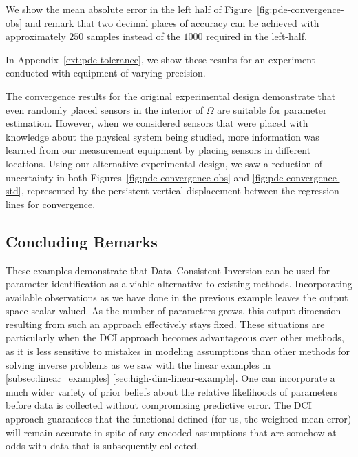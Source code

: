 We show the mean absolute error in the left half of Figure~\ref{fig:pde-convergence-obs} and remark that two decimal places of accuracy can be achieved with approximately $250$ samples instead of the $1000$ required in the left-half.

In Appendix~\ref{ext:pde-tolerance}, we show these results for an experiment conducted with equipment of varying precision.

The convergence results for the original experimental design demonstrate that even randomly placed sensors in the interior of $\Omega$ are suitable for parameter estimation.
However, when we considered sensors that were placed with knowledge about the physical system being studied, more information was learned from our measurement equipment by placing sensors in different locations.
Using our alternative experimental design, we saw a reduction of uncertainty in both Figures~\ref{fig:pde-convergence-obs} and \ref{fig:pde-convergence-std}, represented by the persistent vertical displacement between the regression lines for convergence.


\FloatBarrier
\subsection{Concluding Remarks}

These examples demonstrate that Data--Consistent Inversion can be used for parameter identification as a viable alternative to existing methods.
Incorporating available observations as we have done in the previous example leaves the output space scalar-valued.
As the number of parameters grows, this output dimension resulting from such an approach effectively stays fixed.
These situations are particularly when the DCI approach becomes advantageous over other methods, as it is less sensitive to mistakes in modeling assumptions than other methods for solving inverse problems as we saw with the linear examples in \ref{subsec:linear_examples} \ref{sec:high-dim-linear-example}.
One can incorporate a much wider variety of prior beliefs about the relative likelihoods of parameters before data is collected without compromising predictive error.
The DCI approach guarantees that the functional defined (for us, the weighted mean error) will remain accurate in spite of any encoded assumptions that are somehow at odds with data that is subsequently collected.
